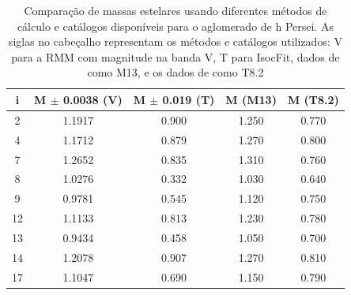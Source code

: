 \begin{table}[htbp]
\centering
\caption[Resultados de massas estelares para h Persei]{Comparação de massas estelares usando diferentes métodos de cálculo e catálogos disponíveis para o aglomerado de h Persei. As siglas no cabeçalho representam os métodos e catálogos utilizados: V para a RMM com magnitude na banda V, T para IsocFit, dados de  como M13, e os dados de   como T8.2}
\label{tab:hper_massas}
\begin{tabular}{ccccc}
\hline
{i} & {M $\pm$ 0.0038 (V)} & {M $\pm$ 0.019 (T)}  & {M (M13)} &  {M (T8.2)} \\ \hline
        2   & 1.1917 & 0.900 & 1.250 & 0.770 \\
		4   & 1.1712 & 0.879 & 1.270 & 0.800 \\
		7   & 1.2652 & 0.835 & 1.310 & 0.760 \\
		8   & 1.0276 & 0.332 & 1.030 & 0.640 \\
		9   & 0.9781 & 0.545 & 1.120 & 0.750 \\
		12  & 1.1133 & 0.813 & 1.230 & 0.780 \\
		13  & 0.9434 & 0.458 & 1.050 & 0.700 \\
		14  & 1.2078 & 0.907 & 1.270 & 0.810 \\
		17  & 1.1047 & 0.690 & 1.150 & 0.790 \\
        \hline
\end{tabular}
\end{table}

